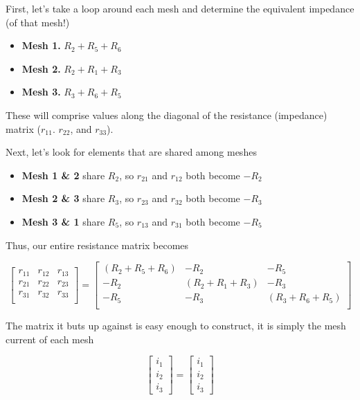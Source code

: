 \documentclass[11pt]{book}
\begin{document}
First, let's take a loop around each mesh and determine the equivalent impedance (of that mesh!)
\begin{itemize}
	\item \textbf{Mesh 1.} $R_2 + R_5 + R_6$
	\item \textbf{Mesh 2.} $R_2 + R_1 + R_3$
	\item \textbf{Mesh 3.} $R_3 + R_6 + R_5$
\end{itemize}

These will comprise values along the diagonal of the resistance (impedance) matrix ($r_{11}$. $r_{22}$, and $r_{33}$).

Next, let's look for elements that are shared among meshes
\begin{itemize}
	\item \textbf{Mesh 1 \& 2} share $R_2$, so $r_{21}$ and $r_{12}$ both become $-R_2$
	\item \textbf{Mesh 2 \& 3} share $R_3$, so $r_{23}$ and $r_{32}$ both become $-R_3$
	\item \textbf{Mesh 3 \& 1} share $R_5$, so $r_{13}$ and $r_{31}$ both become $-R_5$
\end{itemize}

Thus, our entire resistance matrix becomes

\begin{equation}
	\begin{bmatrix}
		r_{11} & r_{12} & r_{13} \\
		r_{21} & r_{22} & r_{23} \\
		r_{31} & r_{32} & r_{33} \\
	\end{bmatrix}
	=
	\begin{bmatrix}
		(R_2 + R_5 + R_6) & -R_2 & -R_5 \\
		-R_2 & (R_2 + R_1 + R_3) & -R_3 \\
		-R_5 & -R_3 & (R_3 + R_6 + R_5) \\
	\end{bmatrix}
\end{equation}

The matrix it buts up against is easy enough to construct, it is simply the mesh current of each mesh

\begin{equation}
	\begin{bmatrix}
		i_1 \\ i_2 \\ i_3
	\end{bmatrix}
	=
	\begin{bmatrix}
		i_1 \\ i_2 \\ i_3
	\end{bmatrix}
\end{equation}
	
\end{document}
